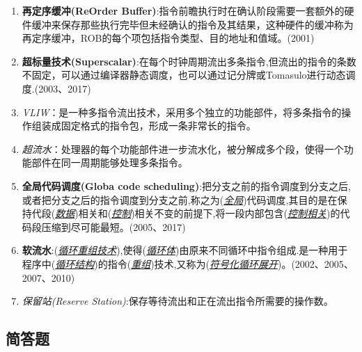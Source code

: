 \documentclass[a4paper]{ctexart}
\newcommand{\blank}[1]{(\emph{\underline{#1}})}
\begin{document}
\begin{enumerate}
  \item \textbf{再定序缓冲(ReOrder Buffer)}:指令前瞻执行时在确认阶段需要一套额外的硬件缓冲来保存那些执行完毕但未经确认的指令及其结果，这种硬件的缓冲称为再定序缓冲，ROB的每个项包括指令类型、目的地址和值域。(2001)
  \item \textbf{超标量技术(Superscalar)}:在每个时钟周期流出多条指令,但流出的指令的条数不固定，可以通过编译器静态调度，也可以通过记分牌或Tomasulo进行动态调度.(2003、2017)
  \item \emph{VLIW}：是一种多指令流出技术，采用多个独立的功能部件，将多条指令的操作组装成固定格式的指令包，形成一条非常长的指令。
  \item \emph{超流水}：处理器的每个功能部件进一步流水化，被分解成多个段，使得一个功能部件在同一周期能够处理多条指令。
  \item \textbf{全局代码调度(Globa code scheduling)}:把分支之前的指令调度到分支之后,或者把分支之后的指令调度到分支之前,称之为(\emph{\underline{全局}})代码调度,其目的是在保持代段\blank{数据}相关和\blank{控制}相关不变的前提下,将一段内部包含\blank{控制相关}的代码段压缩到尽可能最短。(2005、2017)
  \item \textbf{软流水}:\blank{循环重组技术},使得\blank{循环体}由原来不同循环中指令组成.是一种用于程序中\blank{循环结构}的指令\blank{重组}技术,又称为\blank{符号化循环展开}。(2002、2005、2007、2010)
  \item \emph{保留站(Reserve Station)}:保存等待流出和正在流出指令所需要的操作数。
\end{enumerate}
\subsection{简答题}
\end{document}
